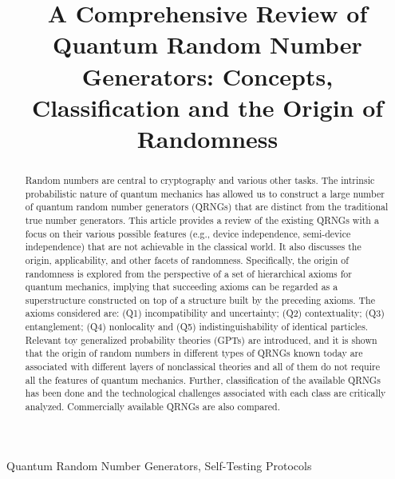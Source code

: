 \documentclass[]{interact}
\theoremstyle{plain}%
\theoremstyle{definition}
\theoremstyle{remark}
\begin{document}

\title{A Comprehensive Review of Quantum Random Number Generators: Concepts, Classification and the Origin of Randomness}

\author{
}

\maketitle

\begin{abstract}
Random numbers are central to cryptography and various other tasks. The intrinsic probabilistic nature of quantum mechanics has allowed us to construct a large number of quantum random number generators (QRNGs) that are distinct from the traditional true number generators. This article provides a review of the existing QRNGs with a focus on their various possible features  (e.g., device independence, semi-device independence) that are not achievable in the classical world. It also discusses the origin, applicability, and other facets of randomness. Specifically, the origin of randomness is explored from the perspective of a set of hierarchical axioms for quantum mechanics, implying that succeeding axioms can be regarded as a superstructure constructed on top of a structure built by the preceding axioms. The axioms considered are: (Q1) incompatibility and uncertainty; (Q2) contextuality; (Q3) entanglement; (Q4) nonlocality and (Q5) indistinguishability of identical particles. Relevant toy generalized probability theories (GPTs) are introduced, and it is shown that the origin of random numbers in different types of QRNGs known today are associated with different layers of nonclassical theories and all of them do not require all the features of quantum mechanics. Further, classification of the available QRNGs has been done and the technological challenges associated with each class are critically analyzed. Commercially available QRNGs are also compared.
\end{abstract}

\begin{keywords}
 Quantum Random Number Generators, Self-Testing Protocols
\end{keywords}
\end{document}
